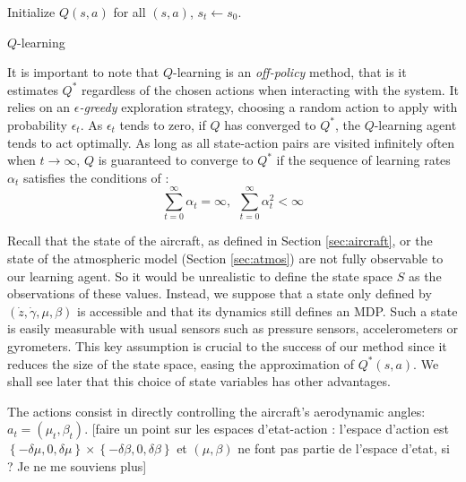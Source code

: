 \documentclass[a4paper, 10pt, conference]{ieeeconf}
\begin{document}
\begin{algorithm2e}
\DontPrintSemicolon
Initialize $Q(s,a)$ for all $(s,a)$,\;{}
$s_{t} \leftarrow s_{0}$.\;
\caption{$Q$-learning}
\label{alg:q-learning}
\end{algorithm2e}

It is important to note that $Q$-learning is an \emph{off-policy} method, that is it estimates $Q^*$ regardless of the chosen actions when interacting with the system. It relies on an \emph{$\epsilon$-greedy} exploration strategy, choosing a random action to apply with probability $\epsilon_t$. As $\epsilon_t$ tends to zero, if $Q$ has converged to $Q^*$, the $Q$-learning agent tends to act optimally. As long as all state-action pairs are visited infinitely often when $t\rightarrow\infty$, $Q$ is guaranteed to converge to $Q^*$ if the sequence of learning rates $\alpha_t$ satisfies the conditions of \cite{robbins1951}: 
\begin{equation*}
\sum_{t=0}^\infty \alpha_t = \infty, \ \
\sum_{t=0}^\infty \alpha_t^2 < \infty
\end{equation*}

Recall that the state of the aircraft, as defined in Section \ref{sec:aircraft}, or the state of the atmospheric model (Section \ref{sec:atmos}) are not fully observable to our learning agent. So it would be unrealistic to define the state space $S$ as the observations of these values. Instead, we suppose that a state only defined by $(\dot{z}, \dot{\gamma}, \mu, \beta)$ is accessible and that its dynamics still defines an MDP. Such a state is easily {\color{red}measurable with usual} sensors such as pressure sensors, accelerometers or gyrometers. This key assumption is crucial to the success of our method since it reduces the size of the state space, easing the approximation of $Q^*(s,a)$. We shall see later that this choice of state variables has other advantages.

The actions consist in directly controlling the aircraft's aerodynamic angles: $a_t=(\mu_t,\beta_t)$.
{\color{red} [faire un point sur les espaces d'etat-action : l'espace d'action est $\left\{-\delta\mu,0,\delta\mu\right\}\times\left\{-\delta\beta,0,\delta\beta\right\}$ et $(\mu,\beta)$ ne font pas partie de l'espace d'etat, si ? Je ne me souviens plus]}
\end{document}

